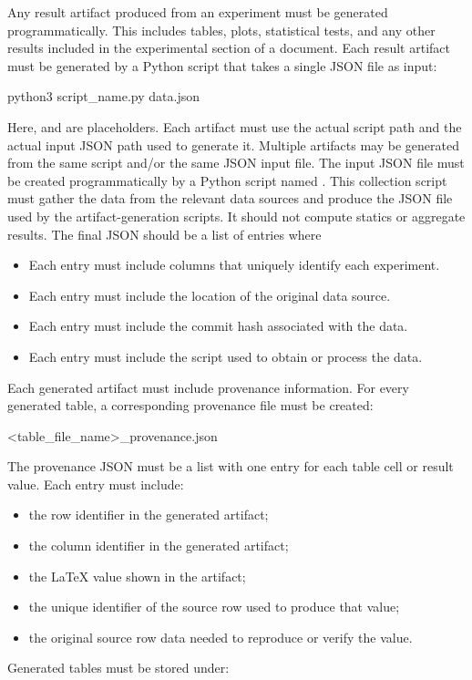 
Any result artifact produced from an experiment must be generated programmatically. 
This includes tables, plots, statistical tests, and any other results included in the experimental section of a document.
Each result artifact must be generated by a Python script that takes a single JSON file as input:
\begin{DocCode}
python3 script_name.py data.json
\end{DocCode}
Here,  and  are placeholders. Each artifact must use the actual script path and the actual input JSON path used to generate it.
Multiple artifacts may be generated from the same script and/or the same JSON input file.
The input JSON file must be created programmatically by a Python script named .
This collection script must gather the data from the relevant data sources and produce the JSON file used by the artifact-generation scripts.
It should not compute statics or aggregate results.
The final JSON should be a list of entries where
\begin{itemize}
    \item Each entry must include columns that uniquely identify each experiment.
    \item Each entry must include the location of the original data source.
    \item Each entry must include the commit hash associated with the data.
    \item Each entry must include the script used to obtain or process the data.
\end{itemize}
Each generated artifact must include provenance information. For every generated  table, a corresponding provenance file must be created:
\begin{DocCode}
<table_file_name>_provenance.json
\end{DocCode}
The provenance JSON must be a list with one entry for each table cell or result value. Each entry must include:
\begin{itemize}
\item the row identifier in the generated artifact;
\item the column identifier in the generated artifact;
\item the LaTeX value shown in the artifact;
\item the unique identifier of the source row used to produce that value;
\item the original source row data needed to reproduce or verify the value.
\end{itemize}
Generated tables must be stored under:

